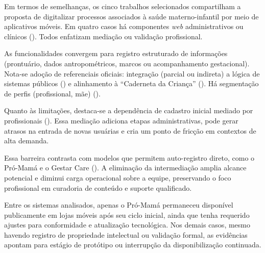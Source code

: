 
Em termos de semelhanças, os cinco trabalhos selecionados compartilham a proposta de digitalizar processos associados à saúde materno-infantil por meio de aplicativos móveis. Em quatro casos há componentes \emph{web} administrativos ou clínicos (). Todos enfatizam mediação ou validação profissional.

As funcionalidades convergem para registro estruturado de informações (prontuário, dados antropométricos, marcos ou acompanhamento gestacional). Nota-se adoção de referenciais oficiais: integração (parcial ou indireta) a lógica de sistemas públicos () e alinhamento à ``Caderneta da Criança'' (). Há segmentação de perfis (profissional, mãe) ().

Quanto às limitações, destaca-se a dependência de cadastro inicial mediado por profissionais (). Essa mediação adiciona etapas administrativas, pode gerar atrasos na entrada de novas usuárias e cria um ponto de fricção em contextos de alta demanda.

Essa barreira contrasta com modelos que permitem auto-registro direto, como o Pró-Mamá e o Gestar Care (). A eliminação da intermediação amplia alcance potencial e diminui carga operacional sobre a equipe, preservando o foco profissional em curadoria de conteúdo e suporte qualificado.

Entre os sistemas analisados, apenas o Pró-Mamá permaneceu disponível publicamente em lojas móveis após seu ciclo inicial, ainda que tenha requerido ajustes para conformidade e atualização tecnológica. Nos demais casos, mesmo havendo registro de propriedade intelectual ou validação formal, as evidências apontam para estágio de protótipo ou interrupção da disponibilização continuada.

